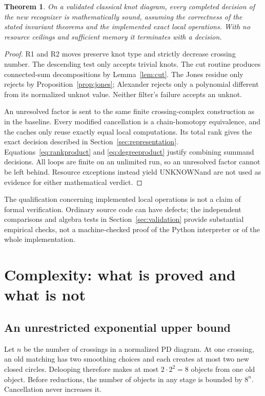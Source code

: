 \documentclass[11pt]{article}
\newtheorem{theorem}{Theorem}[section]
\theoremstyle{definition}\newtheorem{definition}[theorem]{Definition}
\theoremstyle{remark}\newtheorem{remark}[theorem]{Remark}
\newcommand{\UNKNOWN}{\textsf{UNKNOWN}}
\begin{document}
\begin{theorem}\label{thm:soundness}
On a validated classical knot diagram, every completed decision of the new
recognizer is mathematically sound, assuming the correctness of the stated
invariant theorems and the implemented exact local operations. With no
resource ceilings and sufficient memory it terminates with a decision.
\end{theorem}
\begin{proof}
R1 and R2 moves preserve knot type and strictly decrease crossing number.
The descending test only accepts trivial knots. The cut routine produces
connected-sum decompositions by Lemma~\ref{lem:cut}. The Jones residue only
rejects by Proposition~\ref{prop:jones}; Alexander rejects only a polynomial
different from its normalized unknot value. Neither filter's failure accepts
an unknot.

An unresolved factor is sent to the same finite crossing-complex construction
as in the baseline. Every modified cancellation is a chain-homotopy
equivalence, and the caches only reuse exactly equal local computations.
Its total rank gives the exact decision described in
Section~\ref{sec:representation}. Equations~\eqref{eq:rankproduct} and
\eqref{eq:degreeproduct} justify combining summand decisions. All loops are
finite on an unlimited run, so an unresolved factor cannot be left behind.
Resource exceptions instead yield \UNKNOWN and are not used as evidence for
either mathematical verdict.
\end{proof}

The qualification concerning implemented local operations is not a claim of
formal verification. Ordinary source code can have defects; the independent
comparisons and algebra tests in Section~\ref{sec:validation} provide
substantial empirical checks, not a machine-checked proof of the Python
interpreter or of the whole implementation.

\section{Complexity: what is proved and what is not}
\label{sec:complexity}

\subsection{An unrestricted exponential upper bound}

Let $n$ be the number of crossings in a normalized PD diagram. At one crossing,
an old matching has two smoothing choices and each creates at most two new
closed circles. Delooping therefore makes at most $2\cdot2^2=8$ objects from
one old object. Before reductions, the number of objects in any stage is
bounded by $8^n$. Cancellation never increases it.
\end{document}
